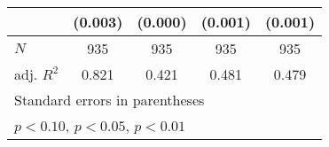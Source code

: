 {\begin{tabular}{l*{4}{c}}
            &     (0.003)         &     (0.000)         &     (0.001)         &     (0.001)         \\
\hline
\(N\)       &         935         &         935         &         935         &         935         \\
adj. \(R^{2}\)&       0.821         &       0.421         &       0.481         &       0.479         \\
\hline\hline
\multicolumn{5}{l}{\footnotesize Standard errors in parentheses}\\
\multicolumn{5}{l}{\footnotesize \sym{*} \(p<0.10\), \sym{**} \(p<0.05\), \sym{***} \(p<0.01\)}\\
\end{tabular}
}
